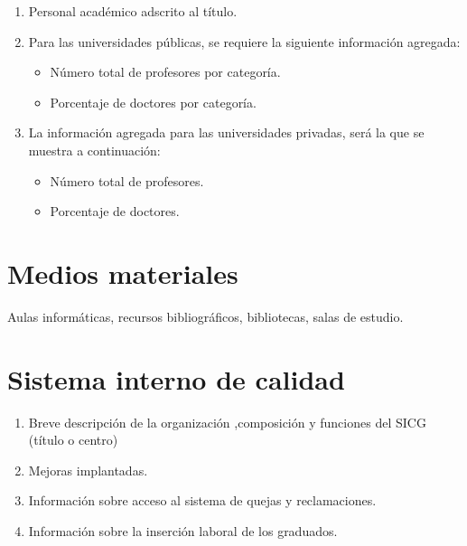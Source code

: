 \begin{enumerate}

    \item Personal académico adscrito al título.

    \item Para las universidades públicas, se requiere la siguiente información agregada:

        \begin{itemize}

            \item Número total de profesores por categoría.

            \item Porcentaje de doctores por categoría.

        \end{itemize}

    \item La información agregada para las universidades privadas, será la que
        se muestra a continuación:

        \begin{itemize}

            \item Número total de profesores.

            \item Porcentaje de doctores.

        \end{itemize}

\end{enumerate}

\section{Medios materiales}

 Aulas informáticas, recursos bibliográficos, bibliotecas, salas de estudio.

\section{Sistema interno de calidad}

\begin{enumerate}

    \item Breve descripción de la organización ,composición y funciones del SICG
        (título o centro)

    \item Mejoras implantadas.

    \item Información sobre acceso al sistema de quejas y reclamaciones.

    \item Información sobre la inserción laboral de los graduados.

\end{enumerate}

{}

